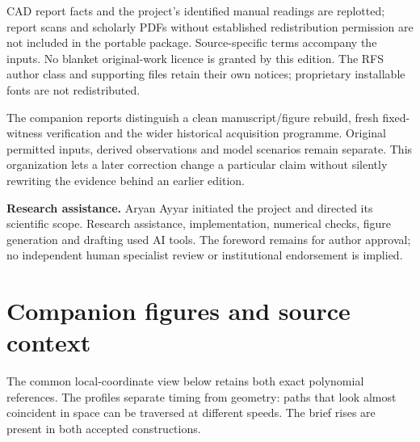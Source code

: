 CAD report facts and the project's identified manual readings are replotted; report scans and scholarly PDFs without established redistribution permission are not included in the portable package. Source-specific terms accompany the inputs. No blanket original-work licence is granted by this edition. The RFS author class and supporting files retain their own notices; proprietary installable fonts are not redistributed.

The companion reports distinguish a clean manuscript/figure rebuild, fresh fixed-witness verification and the wider historical acquisition programme. Original permitted inputs, derived observations and model scenarios remain separate. This organization lets a later correction change a particular claim without silently rewriting the evidence behind an earlier edition.

\medskip\noindent\textbf{Research assistance.} Aryan Ayyar initiated the project and directed its scientific scope. Research assistance, implementation, numerical checks, figure generation and drafting used AI tools. The foreword remains for author approval; no independent human specialist review or institutional endorsement is implied.


\FloatBarrier
\section{Companion figures and source context}\label{app:views}
The common local-coordinate view below retains both exact polynomial references. The profiles separate timing from geometry: paths that look almost coincident in space can be traversed at different speeds. The brief rises are present in both accepted constructions.
\FloatBarrier
{}
\FloatBarrier
{}
\FloatBarrier
